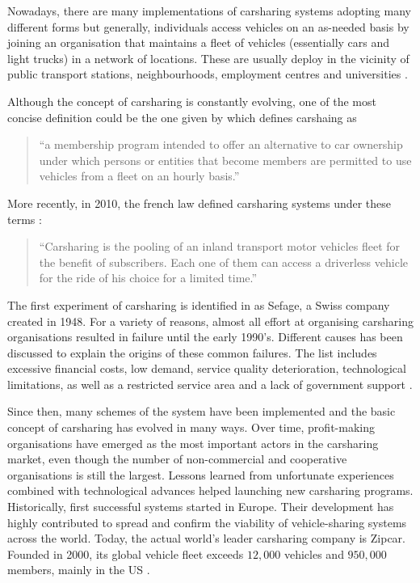 \begin{bibunit}[ieeetr]
\medskip
Nowadays, there are many implementations of carsharing systems adopting many different forms but generally, individuals access vehicles on an as-needed basis by joining an organisation that maintains a fleet of vehicles (essentially cars and light trucks) in a network of locations.
These are usually deploy in the vicinity of public transport stations, neighbourhoods, employment centres and universities \cite{shaheen_carsharing_1998}.

\bigskip
Although the concept of carsharing is constantly evolving, one of the most concise definition could be the one given by \cite{millard_ball_car_sharing_2005} which defines carshaing as
\begin{quote}
``a membership program intended to offer an alternative to car ownership under which persons or entities that become members are permitted to use vehicles from a fleet on an hourly basis.''
\end{quote}
More recently, in 2010, the french law defined carsharing systems under these terms :
\begin{quote}
``Carsharing is the pooling of an inland transport motor vehicles fleet for the benefit of subscribers. Each one of them can access a driverless vehicle for the ride of his choice for a limited time.'' \cite{cs_loi_2010}
\end{quote}

\bigskip
The first experiment of carsharing is identified in \cite{shaheen_short_1999} as Sefage, a Swiss company created in 1948.
For a variety of reasons, almost all effort at organising carsharing organisations resulted in failure until the early 1990's.
Different causes has been discussed to explain the origins of these common failures.
The list includes excessive financial costs, low demand, service quality deterioration, technological limitations, as well as a restricted service area and a lack of government support \cite{harms_emergence_1998, cousins_theory_2000}.

\medskip
Since then, many schemes of the system have been implemented and the basic concept of carsharing has evolved in many ways.
Over time, profit-making organisations have emerged as the most important actors in the carsharing market, even though the number of non-commercial and cooperative organisations is still the largest.
Lessons learned from unfortunate experiences combined with technological advances helped launching new carsharing programs.
Historically, first successful systems started in Europe.
Their development has highly contributed to spread and confirm the viability of vehicle-sharing systems across the world.
Today, the actual world's leader carsharing company is Zipcar.
Founded in 2000, its global vehicle fleet exceeds $12,000$ vehicles and $950,000$ members, mainly in the US \cite{zipcar_website}.


\end{bibunit}
